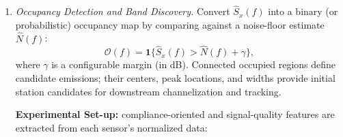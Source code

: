 \documentclass[11pt]{report}
\begin{document}
\begin{enumerate}
\begin{verticalrulelist}
\begin{itemize}[label=$\triangleright$, leftmargin=*, itemsep=0.3em]
			\item \textsl{Power at specific frequencies:} $\widehat{S}_{x}(f_k)$ 
			for selected $f_k$ (e.g., nominal channel centers).
			\item \textit{Peak frequency:} $f_{\text{pk}} \triangleq 
			\arg\max_{f}\,\widehat{S}_{x}(f)$ (candidate carrier location).
			\item \textsl{Occupied bandwidth:} $B_{\text{occ}}$ defined as the 
			smallest bandwidth around a center $f_c$ that contains a prescribed 
			fraction of in-band power (e.g., $99\%$), or equivalently via a 
			thresholded support set.
			\item \textsl{Center frequency (spectral centroid):} $f_{\text{cent}}$ 
			interpreted as a power-weighted mean frequency over the analyzed band.
			\item \textsl{SNR proxy:} Robust estimate of in-band signal power 
			relative to a noise-floor estimate, producing $\widehat{\mathrm{SNR}}$ 
			for detection confidence and alert thresholds.
		\end{itemize}
	\end{verticalrulelist}
	\item \textit{Occupancy Detection and Band Discovery.}
	Convert $\widehat{S}_{x}(f)$ into a binary (or probabilistic) occupancy 
	map by comparing against a noise-floor estimate $\widehat{N}(f)$:
	\[
	\mathcal{O}(f)=\mathbf{1}\{\widehat{S}_{x}(f) > \widehat{N}(f)+\gamma\},
	\]
	where $\gamma$ is a configurable margin (in dB). Connected occupied 
	regions define candidate emissions; their centers, peak locations, and 
	widths provide initial station candidates for downstream channelization 
	and tracking.
	
	\begin{verticalrulelist}
		\textbf{Experimental Set-up:}    compliance-oriented and signal-quality features are extracted from each sensor's normalized data:
	

\end{verticalrulelist}
\end{enumerate}
\end{document}

